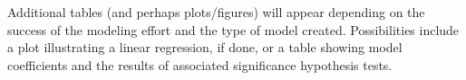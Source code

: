 \documentclass{article}
\begin{document}
Additional tables (and perhaps plots/figures) will appear depending on the success of the modeling effort and the type of model created.  Possibilities include a plot illustrating a linear regression, if done, or a table showing model coefficients and the results of associated significance hypothesis tests.
\end{document}
